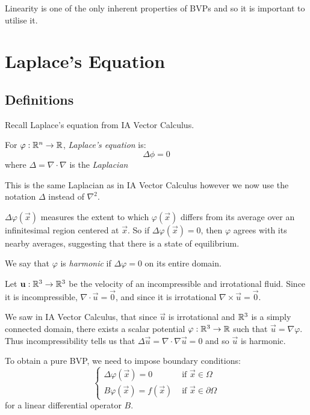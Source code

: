 \documentclass[../main.tex]{subfiles}
\begin{document}
\begin{remark}[Advice]
  Linearity is one of the only inherent properties of BVPs and so it is important to utilise it.
\end{remark}
\section{Laplace's Equation} \label{laplace}
\subsection{Definitions}
Recall Laplace's equation from IA Vector Calculus.
\begin{definition}
  For $\varphi: \mathbb{R}^n \to \mathbb{R}$, \textit{Laplace's equation} is:
  \[
    \Delta \phi = 0
  \]
  where $\Delta = \nabla \cdot \nabla$ is the \textit{Laplacian}
\end{definition}
\begin{remark}[Notation]
  This is the same Laplacian as in IA Vector Calculus however we now use the notation $\Delta$ instead of $\nabla^2$.
\end{remark}
\begin{remark}[Intuition]
  $\Delta \varphi(\vec{x})$ measures the extent to which $\varphi(\vec{x})$ differs from its average over an infinitesimal region centered at $\vec{x}$.
  So if $\Delta \varphi(\vec{x}) = 0$, then $\varphi$ agrees with its nearby averages, suggesting that there is a state of equilibrium.
\end{remark}
\begin{definition}
  We say that $\varphi$ is \textit{harmonic} if $\Delta \varphi = 0$ on its entire domain.
\end{definition}
\begin{example}
  Let $\mathbf{\bm{u}}: \mathbb{R}^3 \to \mathbb{R}^3$ be the velocity of an incompressible and irrotational fluid.
  Since it is incompressible, $\nabla \cdot \vec{u} = \vec{0}$, and since it is irrotational $\nabla \times \vec{u} = \vec{0}$.

  We saw in IA Vector Calculus, that since $\vec{u}$ is irrotational and $\mathbb{R}^3$ is a simply connected domain, there exists a scalar potential $\varphi: \mathbb{R}^3 \to \mathbb{R}$ such that $\vec{u} = \nabla \varphi$.
  Thus incompressibility tells us that $\Delta \vec{u} = \nabla \cdot \nabla \vec{u} = 0$ and so $\vec{u}$ is harmonic.
\end{example}
To obtain a pure BVP, we need to impose boundary conditions:
\[
  \begin{cases}
  \Delta \varphi(\vec{x}) = 0 & \text{ if } \vec{x} \in \Omega \\
  B\varphi(\vec{x}) = f(\vec{x}) & \text{ if } \vec{x} \in \partial \Omega
  \end{cases}
\]
for a linear differential operator $B$.
\end{document}
